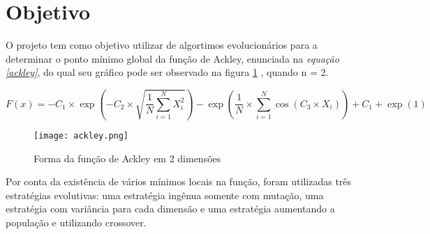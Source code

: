 \documentclass[
	article,			%
	11pt,				%
	oneside,			%
	a4paper,			%
	english,			%
	brazil,				%
	]{abntex2}
\begin{document}
\frenchspacing 


%
%
\maketitle
\newpage
\tableofcontents
\newpage

\textual

\section*{Objetivo}

O projeto tem como objetivo utilizar de algortimos evolucionários para a determinar o ponto mínimo global da função de Ackley, enunciada na \emph{equação \ref{ackley}}, do qual seu gráfico pode ser observado na figura \ref{ackleyfig} , quando n = 2.

    \begin{equation} \label{ackley}
      F(x) = -C_1 \times \exp(-C_2 \times \sqrt{ \frac{1}{N} \displaystyle\sum_{i=1}^{N} X_i^{2} }) - \exp(\frac{1}{N} \times \displaystyle\sum_{i=1}^{N} \cos(C_3 \times X_i)) + C_1 + \exp{(1)}
    \end{equation}

    \begin{figure}[h] \label{ackleyfig}
      \centering
      \texttt{[image: ackley.png]}
      \caption{Forma da função de Ackley em 2 dimensões}
    \end{figure}

Por conta da existência de vários mínimos locais na função, foram utilizadas três estratégias evolutivas: uma estratégia ingênua somente com mutação, uma estratégia com variância para cada dimensão e uma estratégia aumentando a população e utilizando crossover. 
\end{document}
